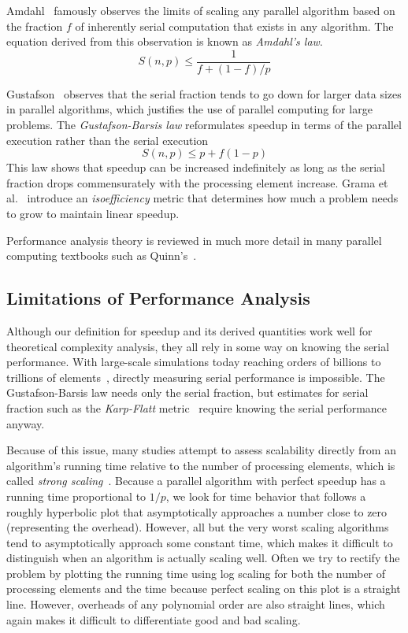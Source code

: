 \documentclass[conference]{IEEEtran}
\newcommand*{\lcite}[1]{~\cite{#1}}
\newcommand*{\scite}[1]{~\cite{#1}}
\newcommand{\etal}{et al.\xspace}
\newcommand*{\keyterm}[1]{\emph{#1}}
\begin{document}
Amdahl\scite{Amdahl1967} famously observes the limits of scaling any
parallel algorithm based on the fraction $f$ of inherently serial
computation that exists in any algorithm. The equation derived from this
observation is known as \keyterm{Amdahl's law}.
\begin{equation}
  S(n,p) \leq \frac{1}{f + (1-f)/p}
  \label{eq:Amdahl}
\end{equation}

Gustafson\scite{Gustafson1988} observes that the serial fraction tends to
go down for larger data sizes in parallel algorithms, which justifies the
use of parallel computing for large problems. The \keyterm{Gustafson-Barsis
  law} reformulates speedup in terms of the parallel execution rather than
the serial execution
\begin{equation}
  S(n,p) \leq p + f(1-p)
  \label{eq:GustafsonBarsis}
\end{equation}
This law shows that speedup can be increased indefinitely as
long as the serial fraction drops commensurately with the processing
element increase. Grama \etal\scite{Grama1993} introduce an
\keyterm{isoefficiency} metric that determines how much a problem needs to
grow to maintain linear speedup.

Performance analysis theory is reviewed in much more detail in many
parallel computing textbooks such as Quinn's\scite{Quinn2004}.

\subsection{Limitations of Performance Analysis}

\noindent
Although our definition for speedup and its derived quantities work well
for theoretical complexity analysis, they all rely in some way on knowing
the serial performance. With large-scale simulations today reaching orders
of billions to trillions of
elements\lcite{Bernaschi2013,Rossinelli2013,Bussmann2013,Habib2013},
directly measuring serial performance is impossible. The Gustafson-Barsis
law needs only the serial fraction, but estimates for serial
fraction such as the \keyterm{Karp-Flatt} metric\lcite{Karp1990} require
knowing the serial performance anyway.

Because of this issue, many studies attempt to assess scalability directly
from an algorithm's running time relative to the number of processing
elements, which is called \keyterm{strong scaling}\lcite{Kaminsky2014}.
Because a parallel algorithm with perfect speedup has a running time
proportional to $1/p$, we look for time behavior that follows a roughly
hyperbolic plot that asymptotically approaches a number close to zero
(representing the overhead). However, all but the very worst scaling
algorithms tend to asymptotically approach some constant time, which makes
it difficult to distinguish when an algorithm is actually scaling
well. Often we try to rectify the problem by plotting the running time
using log scaling for both the number of processing elements and the time
because perfect scaling on this plot is a straight line. However, overheads
of any polynomial order are also straight lines, which again makes it
difficult to differentiate good and bad scaling.
\end{document}
